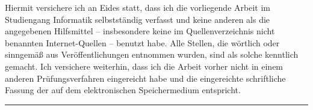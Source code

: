 \documentclass[12pt,a4paper]{article}
\newcommand*{\xdash}[1][3em]{\rule[0.5ex]{#1}{0.55pt}}
\begin{document}
\newpage
\printbibliography
\newpage
Hiermit versichere ich an Eides statt, dass ich die vorliegende Arbeit im
Studiengang Informatik selbstständig verfasst und keine anderen als die
angegebenen Hilfsmittel – insbesondere keine im Quellenverzeichnis nicht
benannten Internet-Quellen – benutzt habe. Alle Stellen, die wörtlich oder
sinngemäß aus Veröffentlichungen entnommen wurden, sind als solche kenntlich
gemacht. Ich versichere weiterhin, dass ich die Arbeit vorher nicht in einem
anderen Prüfungsverfahren eingereicht habe und die eingereichte schriftliche
Fassung der auf dem elektronischen Speichermedium entspricht.
\newline
\newline
\begin{flushright}
\xdash[12em]
\end{flushright}
\end{document}
